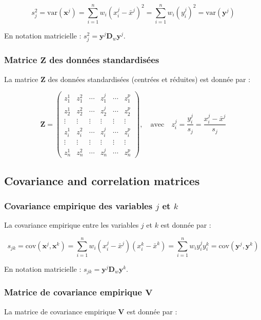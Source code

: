 \documentclass[10pt,a4paper]{article}
\begin{document}
\[
s_j^2 = \text{var}(\mathbf{x}^j) = \sum_{i=1}^n w_i (x_i^j - \bar{x}^j)^2 = \sum_{i=1}^n w_i (y_i^j)^2 = \text{var}(\mathbf{y}^j)
\]

En notation matricielle : $s_j^2 = \mathbf{y}^j \mathbf{D}_w \mathbf{y}^j$.

\subsubsection*{Matrice $\mathbf{Z}$ des données standardisées}
La matrice $\mathbf{Z}$ des données standardisées (centrées et réduites) est donnée par :

\[
\mathbf{Z} = \begin{pmatrix}
z_1^1 & z_1^2 & \cdots & z_1^j & \cdots & z_1^p \\
z_2^1 & z_2^2 & \cdots & z_2^j & \cdots & z_2^p \\
\vdots & \vdots & \vdots & \vdots & \vdots & \vdots \\
z_i^1 & z_i^2 & \cdots & z_i^j & \cdots & z_i^p \\
\vdots & \vdots & \vdots & \vdots & \vdots & \vdots \\
z_n^1 & z_n^2 & \cdots & z_n^j & \cdots & z_n^p
\end{pmatrix}, \quad \text{avec} \quad z_i^j = \frac{y_i^j}{s_j} = \frac{x_i^j - \bar{x}^j}{s_j}
\]

\subsection*{Covariance and correlation matrices}
\subsubsection*{Covariance empirique des variables $j$ et $k$}
La covariance empirique entre les variables $j$ et $k$ est donnée par :

\[
s_{jk} = \text{cov}(\mathbf{x}^j, \mathbf{x}^k) = \sum_{i=1}^n w_i (x_i^j - \bar{x}^j)(x_i^k - \bar{x}^k) = \sum_{i=1}^n w_i y_i^j y_i^k = \text{cov}(\mathbf{y}^j, \mathbf{y}^k)
\]

En notation matricielle : $s_{jk} = \mathbf{y}^j \mathbf{D}_w \mathbf{y}^k$.

\subsubsection*{Matrice de covariance empirique $\mathbf{V}$}
La matrice de covariance empirique $\mathbf{V}$ est donnée par :
\end{document}
